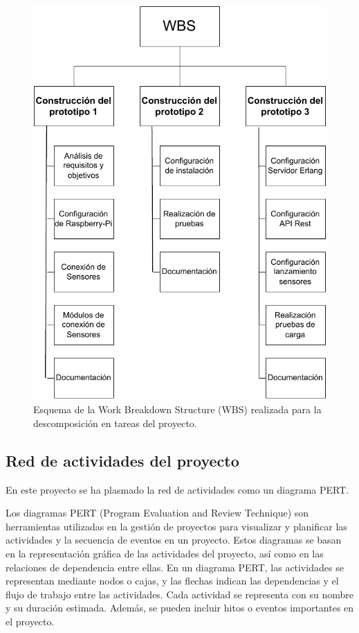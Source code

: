 \begin{figure}[ht]
\centering
\includegraphics[scale=1.2]{images/WBS.pdf}
\caption[WBS del proyecto]{Esquema de la Work Breakdown Structure (WBS) realizada para la descomposición en tareas del proyecto.}%
\label{fig:WBS}
\end{figure}

\cleardoublepage

\subsection{Red de actividades del proyecto}

En este proyecto se ha plasmado la red de actividades como un diagrama PERT.

Los diagramas PERT (Program Evaluation and Review Technique) son herramientas utilizadas en la gestión de proyectos para visualizar y planificar las actividades y la secuencia de eventos en un proyecto. Estos diagramas se basan en la representación gráfica de las actividades del proyecto, así como en las relaciones de dependencia entre ellas. En un diagrama PERT, las actividades se representan mediante nodos o cajas, y las flechas indican las dependencias y el flujo de trabajo entre las actividades. Cada actividad se representa con su nombre y su duración estimada. Además, se pueden incluir hitos o eventos importantes en el proyecto.

